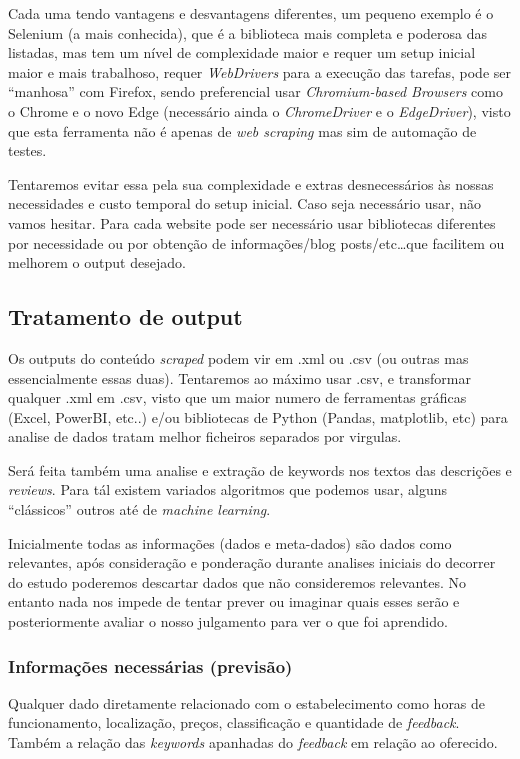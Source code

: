 \documentclass[a4paper,10pt]{article}
\begin{document}
Cada uma tendo vantagens e desvantagens diferentes, um pequeno exemplo é o Selenium (a mais conhecida), que é a biblioteca mais completa e poderosa das listadas, mas tem um nível de complexidade maior e requer um setup inicial maior e mais trabalhoso, requer \textit{WebDrivers} para a execução das tarefas, pode ser ``manhosa'' com Firefox, sendo preferencial usar \textit{Chromium-based Browsers} como o Chrome e o novo Edge (necessário ainda o \textit{ChromeDriver} e o \textit{EdgeDriver}), visto que esta ferramenta não é apenas de \textit{web scraping} mas sim de automação de testes.

Tentaremos evitar essa pela sua complexidade e extras desnecessários às nossas necessidades e custo temporal do setup inicial.
Caso seja necessário usar, não vamos hesitar.
Para cada website pode ser necessário usar bibliotecas diferentes por necessidade ou por obtenção de informações/blog posts/etc\ldots  que facilitem ou melhorem o output desejado.

\subsection{Tratamento de output}

Os outputs do conteúdo \textit{scraped} podem vir em .xml ou .csv (ou outras mas essencialmente essas duas).
Tentaremos ao máximo usar .csv, e transformar qualquer .xml em .csv, visto que um maior numero de ferramentas gráficas (Excel, PowerBI, etc..) e/ou bibliotecas de Python (Pandas, matplotlib, etc) para analise de dados tratam melhor ficheiros separados por virgulas.

Será feita também uma analise e extração de keywords nos textos das descrições e \textit{reviews}.
Para tál existem variados algoritmos que podemos usar, alguns ``clássicos'' outros até de \textit{machine learning}.

Inicialmente todas as informações (dados e meta-dados) são dados como relevantes, após consideração e ponderação durante analises iniciais do decorrer do estudo poderemos descartar dados que não consideremos relevantes.
No entanto nada nos impede de tentar prever ou imaginar quais esses serão e posteriormente avaliar o nosso julgamento para ver o que foi aprendido.

\subsubsection{Informações necessárias (previsão)}

Qualquer dado diretamente relacionado com o estabelecimento como horas de funcionamento, localização, preços, classificação e quantidade de \textit{feedback}.
Também a relação das \textit{keywords} apanhadas do \textit{feedback} em relação ao oferecido.
\end{document}

